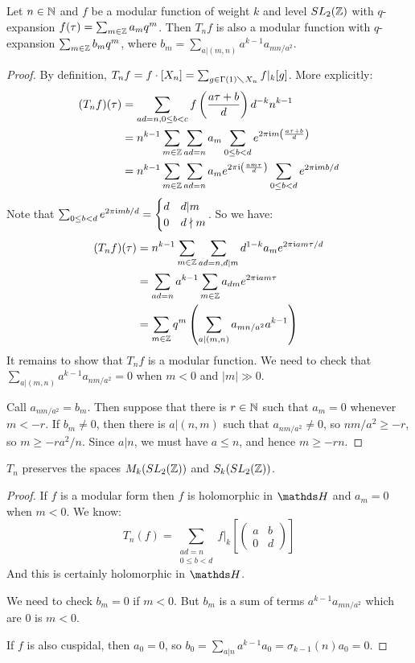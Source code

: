 \documentclass[10pt,a4paper]{article}
\begin{document}
\begin{proposition}
  Let $n \in \mathbb{N}$ and $f$ be a modular function of weight $k$ and level $SL_2(\mathbb{Z})$ with $q$-expansion $f(\tau) = \sum_{m\in \mathbb{Z}}a_m q^m$. Then $T_n f$ is also a modular function with $q$-expansion $\sum_{m \in \mathbb{Z}} b_m q^m$, where $b_m = \sum_{a|(m,n)} a^{k-1}a_{mn/a^2}$.
\end{proposition}
\begin{proof}
  By definition, $T_n f = f \cdot [X_n] = \sum_{g \in \Gamma(1)\diagdown X_n} f|_k[g]$. More explicitly:
  \begin{align*}
    (T_n f)(\tau) &= \sum_{ad = n, 0 \leq b<c} f\left(\frac{a\tau+b}{d}\right)d^{-k}n^{k-1}\\
    &= n^{k-1}\sum_{m \in \mathbb{Z}} \sum_{ad = n} a_m \sum_{0 \leq b < d} e^{2\pi\mathfrak{i} m\left(\frac{a\tau+b}{d}\right)}\\
    &= n^{k-1}\sum_{m \in \mathbb{Z}}\sum_{ad =n}a_m e^{2\pi\mathfrak{i}\left(\frac{am\tau}{d}\right)}\sum_{0\leq b <d}e^{2\pi\mathfrak{i} m b/d}
  \end{align*}
  Note that $\sum_{0\leq b <d} e^{2\pi\mathfrak{i} mb/d} = \begin{cases} d & d|m \\0 & d\nmid m\end{cases}$. So we have:
  \begin{align*}
    (T_n f)(\tau) &= n^{k-1}\sum_{m\in \mathbb{Z}}\sum_{ad = n, d|m}d^{1-k}a_m e^{2\pi\mathfrak{i} a m \tau/d}\\
    &= \sum_{ad = n}a^{k-1}\sum_{m\in\mathbb{Z}}a_{dm}e^{2\pi\mathfrak{i} a m \tau}\\
    &= \sum_{m \in \mathbb{Z}}q^m \left(\sum_{a|(m,n)} a_{mn/a^2}a^{k-1}\right)
  \end{align*}
  It remains to show that $T_n f$ is a modular function. We need to check that $\sum_{a|(m,n)}a^{k-1}a_{nm/a^2} = 0$ when $m<0$ and $|m| \gg 0$.

  Call $a_{nm/a^2} = b_m$. Then suppose that there is $r \in \mathbb{N}$ such that $a_m =0$ whenever $m<-r$. If $b_m \neq 0$, then there is $a|(n,m)$ such that $a_{nm/a^2} \neq 0$, so $nm/a^2 \geq -r$, so $m \geq -ra^2/n$. Since $a|n$, we must have $a \leq n$, and hence $m \geq -rn$.
\end{proof}
\begin{corollary}
  $T_n$ preserves the spaces $M_k(SL_2(\mathbb{Z}))$ and $S_k(SL_2(\mathbb{Z}))$.
\end{corollary}
\begin{proof}
  If $f$ is a modular form then $f$ is holomorphic in $\H$ and $a_m = 0$ when $m < 0$. We know:
  \[T_n(f) = \sum_{\substack{ad = n\\0\leq b<d}} f|_k\left[\begin{pmatrix}a&b\\0&d\end{pmatrix}\right]\]
  And this is certainly holomorphic in $\H$.

  We need to check $b_m = 0$ if $m<0$. But $b_m$ is a sum of terms $a^{k-1}a_{mn/a^2}$ which are $0$ is $m<0$.

  If $f$ is also cuspidal, then $a_0 =0$, so $b_0 = \sum_{a|n}a^{k-1}a_0 = \sigma_{k-1}(n)a_0 = 0$.
\end{proof}
\end{document}

